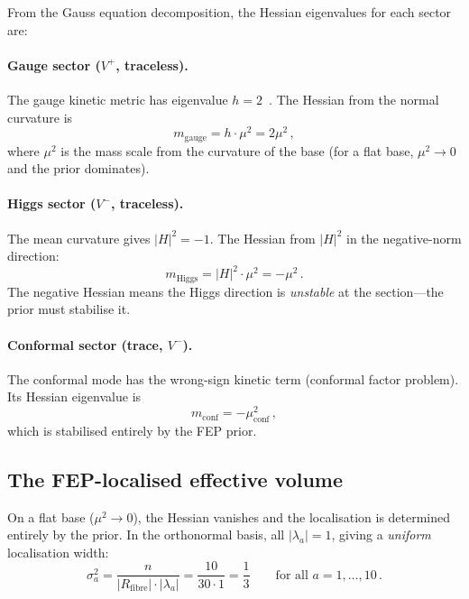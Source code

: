 \documentclass[12pt, a4paper]{article}
\theoremstyle{definition}
\theoremstyle{remark}
\newcommand{\Rfibre}{R_{\mathrm{fibre}}}
\begin{document}
From the Gauss equation decomposition, the Hessian eigenvalues for each sector are:

\paragraph{Gauge sector ($V^+$, traceless).}
The gauge kinetic metric has eigenvalue $h = 2$~\cite{Paper3}.
The Hessian from the normal curvature is
\begin{equation}
m_{\mathrm{gauge}} = h \cdot \mu^2 = 2\mu^2\,,
\end{equation}
where $\mu^2$ is the mass scale from the curvature of the base (for a flat base, $\mu^2 \to 0$ and the prior dominates).

\paragraph{Higgs sector ($V^-$, traceless).}
The mean curvature gives $|H|^2 = -1$.
The Hessian from $|H|^2$ in the negative-norm direction:
\begin{equation}
m_{\mathrm{Higgs}} = |H|^2 \cdot \mu^2 = -\mu^2\,.
\end{equation}
The negative Hessian means the Higgs direction is \emph{unstable} at the section---the prior must stabilise it.

\paragraph{Conformal sector (trace, $V^-$).}
The conformal mode has the wrong-sign kinetic term (conformal factor problem).
Its Hessian eigenvalue is
\begin{equation}
m_{\mathrm{conf}} = -\mu^2_{\mathrm{conf}}\,,
\end{equation}
which is stabilised entirely by the FEP prior.

\subsection{The FEP-localised effective volume}

On a flat base ($\mu^2 \to 0$), the Hessian vanishes and the localisation is determined entirely by the prior.
In the orthonormal basis, all $|\lambda_a| = 1$, giving a \emph{uniform} localisation width:
\begin{equation}
\sigma_a^2 = \frac{n}{|\Rfibre| \cdot |\lambda_a|} = \frac{10}{30 \cdot 1} = \frac{1}{3}\qquad \text{for all } a = 1, \ldots, 10\,.
\end{equation}
\end{document}
